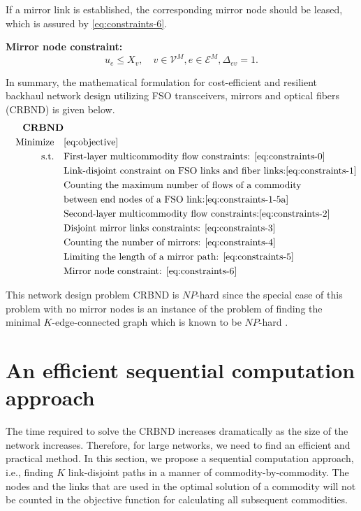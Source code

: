 \documentclass[onecolumn,11pt,draftclsnofoot]{IEEEtran}
\begin{document}
If a mirror link is established, the corresponding mirror node should be leased, which is assured by \eqref{eq:constraints-6}.

\noindent \textbf{Mirror node constraint:}
\begin{equation}\label{eq:constraints-6}
u_e \leq X_v, \quad v \in \mathcal V^M, e \in \mathcal E^M, \Delta_{ev} = 1.
\end{equation}

In summary, the mathematical formulation for cost-efficient and resilient backhaul network design utilizing FSO transceivers, mirrors and optical fibers (CRBND) is given below.
\begin{align}
&& \mbox{\textbf{CRBND}} &\nonumber \\
&& \mbox{Minimize} \quad  & \eqref{eq:objective}  \nonumber\\
&& \mbox{s.t.} \quad & \mbox{First-layer multicommodity flow constraints: } \eqref{eq:constraints-0}  \nonumber\\
&& & \mbox{Link-disjoint constraint on FSO links and fiber links:} \eqref{eq:constraints-1}  \nonumber\\
&& & \mbox{Counting the maximum number of flows of a commodity}  \nonumber\\
&& & \mbox{between end nodes of a FSO link:} \eqref{eq:constraints-1-5a}  \nonumber\\
&& & \mbox{Second-layer multicommodity flow constraints:} \eqref{eq:constraints-2}  \nonumber\\
&& & \mbox{Disjoint mirror links constraints: } \eqref{eq:constraints-3}  \nonumber\\
&& & \mbox{Counting the number of mirrors: } \eqref{eq:constraints-4}  \nonumber\\
&& & \mbox{Limiting the length of a mirror path: } \eqref{eq:constraints-5}  \nonumber\\
&& & \mbox{Mirror node constraint: } \eqref{eq:constraints-6}  \nonumber
\end{align}

This network design problem CRBND is $NP$-hard since the special case of this problem with no mirror nodes is an instance of the problem of finding the minimal $K$-edge-connected graph which is known to be $NP$-hard \cite{Garey1980}.

\section{An efficient sequential computation approach}\label{sec:approach}
The time required to solve the CRBND increases dramatically as the size of the network increases. Therefore, for large networks, we need to find an efficient and practical method. In this section, we propose a sequential computation approach, i.e., finding $K$ link-disjoint paths in a manner of commodity-by-commodity. The nodes and the links that are used in the optimal solution of  a commodity will not be counted in the objective function for calculating all subsequent commodities.
\end{document}
